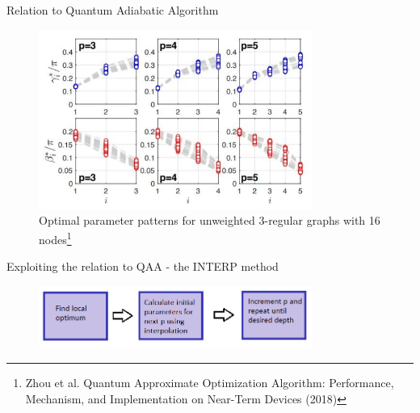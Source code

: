 \documentclass{beamer}
\begin{document}
{\begin{frame}{Relation to Quantum Adiabatic Algorithm}
\begin{figure}
	\centering
	\includegraphics[width=0.8\textwidth]{figures/patterns-u3R}
	\caption{Optimal parameter patterns for unweighted 3-regular graphs with 16 nodes\footnote{Zhou et al. Quantum Approximate Optimization Algorithm: Performance, Mechanism, and Implementation on Near-Term Devices (2018)}}
\end{figure}
\end{frame}

\begin{frame}{Exploiting the relation to QAA - the INTERP method}
\begin{figure}
	\includegraphics[width=0.8\textwidth]{figures/INTERP}
\end{figure}
\captionsetup[subfigure]{labelformat=empty,aboveskip=0pt}
\pause
\begin{figure}
	\qquad
\end{figure}
\end{frame}

}
\end{document}
